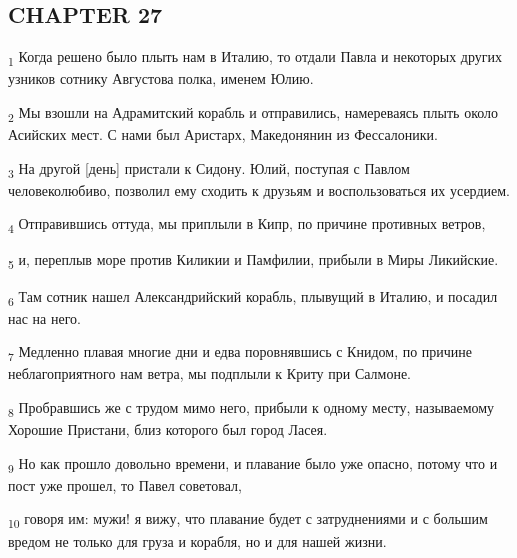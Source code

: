 \subsection{CHAPTER 27}
\begin{tcolorbox}
\textsubscript{1} Когда решено было плыть нам в Италию, то отдали Павла и некоторых других узников сотнику Августова полка, именем Юлию.
\end{tcolorbox}
\begin{tcolorbox}
\textsubscript{2} Мы взошли на Адрамитский корабль и отправились, намереваясь плыть около Асийских мест. С нами был Аристарх, Македонянин из Фессалоники.
\end{tcolorbox}
\begin{tcolorbox}
\textsubscript{3} На другой [день] пристали к Сидону. Юлий, поступая с Павлом человеколюбиво, позволил ему сходить к друзьям и воспользоваться их усердием.
\end{tcolorbox}
\begin{tcolorbox}
\textsubscript{4} Отправившись оттуда, мы приплыли в Кипр, по причине противных ветров,
\end{tcolorbox}
\begin{tcolorbox}
\textsubscript{5} и, переплыв море против Киликии и Памфилии, прибыли в Миры Ликийские.
\end{tcolorbox}
\begin{tcolorbox}
\textsubscript{6} Там сотник нашел Александрийский корабль, плывущий в Италию, и посадил нас на него.
\end{tcolorbox}
\begin{tcolorbox}
\textsubscript{7} Медленно плавая многие дни и едва поровнявшись с Книдом, по причине неблагоприятного нам ветра, мы подплыли к Криту при Салмоне.
\end{tcolorbox}
\begin{tcolorbox}
\textsubscript{8} Пробравшись же с трудом мимо него, прибыли к одному месту, называемому Хорошие Пристани, близ которого был город Ласея.
\end{tcolorbox}
\begin{tcolorbox}
\textsubscript{9} Но как прошло довольно времени, и плавание было уже опасно, потому что и пост уже прошел, то Павел советовал,
\end{tcolorbox}
\begin{tcolorbox}
\textsubscript{10} говоря им: мужи! я вижу, что плавание будет с затруднениями и с большим вредом не только для груза и корабля, но и для нашей жизни.
\end{tcolorbox}
